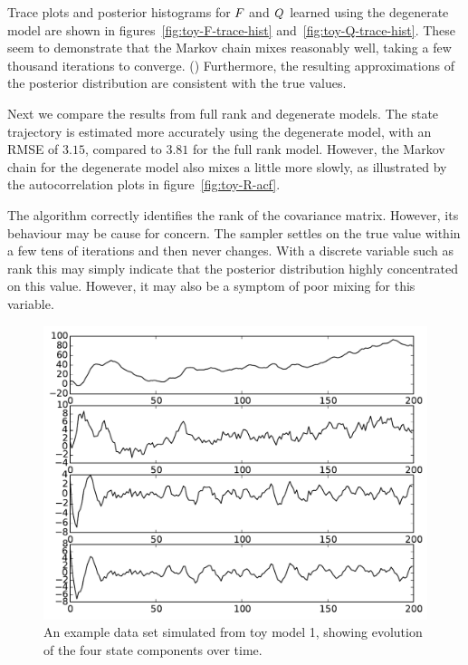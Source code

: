 \documentclass[journal,10pt]{IEEEtran}
\begin{document}
Trace plots and posterior histograms for $F_{}$ and $Q_{}$ learned using the degenerate model are shown in figures~\ref{fig:toy-F-trace-hist} and~\ref{fig:toy-Q-trace-hist}. These seem to demonstrate that the Markov chain mixes reasonably well, taking a few thousand iterations to converge. () Furthermore, the resulting approximations of the posterior distribution are consistent with the true values.

Next we compare the results from full rank and degenerate models. The state trajectory is estimated more accurately using the degenerate model, with an RMSE of $3.15$, compared to $3.81$ for the full rank model. However, the Markov chain for the degenerate model also mixes a little more slowly, as illustrated by the autocorrelation plots in figure~\ref{fig:toy-R-acf}.

The algorithm correctly identifies the rank of the covariance matrix. However, its behaviour may be cause for concern. The sampler settles on the true value within a few tens of iterations and then never changes. With a discrete variable such as rank this may simply indicate that the posterior distribution highly concentrated on this value. However, it may also be a symptom of poor mixing for this variable.

\begin{figure}
 \centering
 \includegraphics[width=0.9\columnwidth]{figures/toy-state.pdf}
 \caption{An example data set simulated from toy model 1, showing evolution of the four state components over time.}
 \label{fig:toy-data}
\end{figure}
\end{document}
